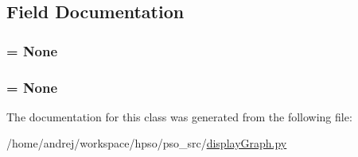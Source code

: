 \subsection{Field Documentation}
\hypertarget{classdisplayGraph_1_1showDescription_d395b33a95e9cbe35418aa298270f560}{
\subsubsection{ = None}}
\label{classdisplayGraph_1_1showDescription_d395b33a95e9cbe35418aa298270f560}


\hypertarget{classdisplayGraph_1_1showDescription_5c9ecb9b79318f02a26eea3377b9a0ef}{
\subsubsection{ = None}}
\label{classdisplayGraph_1_1showDescription_5c9ecb9b79318f02a26eea3377b9a0ef}




The documentation for this class was generated from the following file:\begin{CompactItemize}
\item 
/home/andrej/workspace/hpso/pso\_\-src/\hyperlink{displayGraph_8py}{displayGraph.py}\end{CompactItemize}
